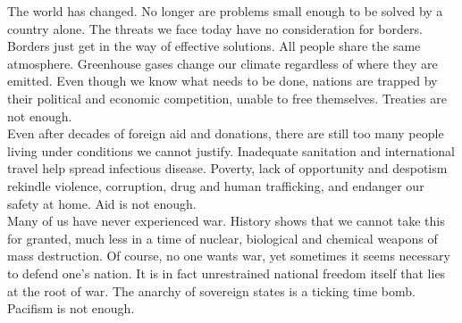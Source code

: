 \documentclass[11pt,a4paper]{article}
\begin{document}
The world has changed. No longer are problems small enough to be solved by a country alone.
The threats we face today have no consideration for borders. Borders just get in the way of effective solutions.
\noindent All people share the same atmosphere.
Greenhouse gases change our climate regardless of where they are emitted.
Even though we know what needs to be done, nations are trapped by their political and economic competition, unable to free themselves. \hfill Treaties are not enough.\\
\noindent Even after decades of foreign aid and donations, there are still too many people living under conditions we cannot justify.
Inadequate sanitation and international travel help spread infectious disease.
Poverty, lack of opportunity and despotism rekindle violence, corruption, drug and human trafficking, and endanger our safety at home.
\hfill Aid is not enough.\\
\noindent Many of us have never experienced war.
History shows that we cannot take this for granted, much less in a time of nuclear, biological and chemical weapons of mass destruction.
Of course, no one wants war, yet sometimes it seems necessary to defend one's nation.
It is in fact unrestrained national freedom itself that lies at the root of war.
The anarchy of sovereign states is a ticking time bomb. \hfill Pacifism is not enough.
\end{document}
